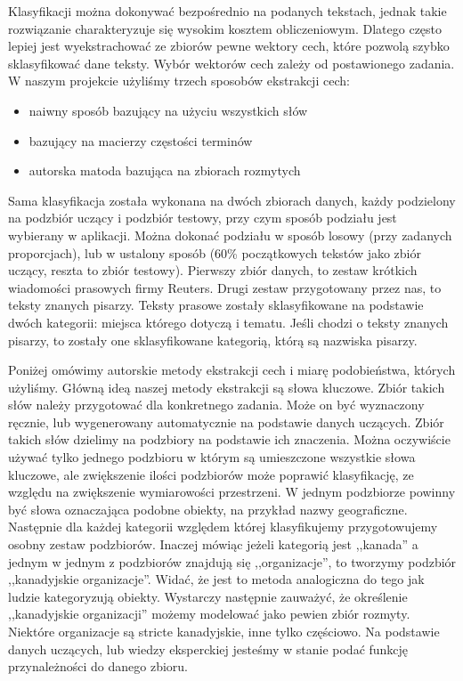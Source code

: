 \documentclass[a4paper]{classrep}
\begin{document}
Klasyfikacji można dokonywać bezpośrednio na podanych tekstach, jednak takie rozwiązanie charakteryzuje się wysokim kosztem obliczeniowym. Dlatego często lepiej jest
wyekstrachować ze zbiorów pewne wektory cech, które pozwolą szybko sklasyfikować dane teksty. Wybór wektorów cech zależy od postawionego zadania.
W naszym projekcie użyliśmy trzech sposobów ekstrakcji cech:
\begin{itemize}
\item naiwny sposób bazujący na użyciu wszystkich słów
\item bazujący na macierzy częstości terminów
\item autorska matoda bazująca na zbiorach rozmytych
\end{itemize}

Sama klasyfikacja została wykonana na dwóch zbiorach danych, każdy podzielony na podzbiór uczący i podzbiór testowy, przy czym sposób podziału jest wybierany w aplikacji.
Można dokonać podziału w sposób losowy (przy zadanych proporcjach), lub w ustalony sposób (60\% początkowych tekstów jako zbiór uczący, reszta to zbiór testowy).
Pierwszy zbiór danych, to zestaw krótkich wiadomości prasowych firmy Reuters. Drugi zestaw przygotowany przez nas, to teksty znanych pisarzy. Teksty prasowe zostały
sklasyfikowane na podstawie dwóch kategorii: miejsca którego dotyczą i tematu. Jeśli chodzi o teksty znanych pisarzy, to zostały one sklasyfikowane kategorią, którą są nazwiska pisarzy.

Poniżej omówimy autorskie metody ekstrakcji cech i miarę podobieństwa, których użyliśmy. 
Główną ideą naszej metody ekstrakcji są słowa kluczowe. Zbiór takich słów należy przygotować dla konkretnego zadania. Może on być wyznaczony ręcznie,
lub wygenerowany automatycznie na podstawie danych uczących. Zbiór takich słów dzielimy na podzbiory na podstawie ich znaczenia. Można oczywiście używać tylko jednego podzbioru
w którym są umieszczone wszystkie słowa kluczowe, ale zwiększenie ilości podzbiorów może poprawić klasyfikację, ze względu na zwiększenie wymiarowości przestrzeni. 
W jednym podzbiorze powinny być słowa oznaczająca podobne obiekty, na przykład nazwy geograficzne. Następnie dla każdej kategorii względem której klasyfikujemy przygotowujemy
osobny zestaw podzbiorów. Inaczej mówiąc jeżeli kategorią jest ,,kanada'' a jednym w jednym z podzbiorów znajdują się ,,organizacje'', to tworzymy podzbiór ,,kanadyjskie organizacje''.
Widać, że jest to metoda analogiczna do tego jak ludzie kategoryzują obiekty. Wystarczy następnie zauważyć, że określenie ,,kanadyjskie organizacji'' możemy modelować
jako pewien zbiór rozmyty. Niektóre organizacje są stricte kanadyjskie, inne tylko częściowo. Na podstawie danych uczących, lub wiedzy eksperckiej jesteśmy w stanie podać
funkcję przynależności do danego zbioru.
\end{document}
